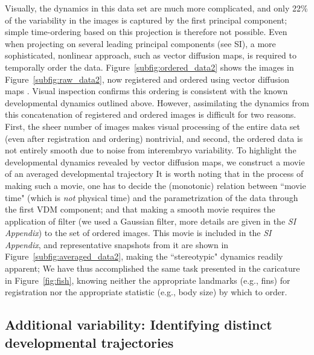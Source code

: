 \documentclass{pnastwo}
\begin{document}
\begin{article}
Visually, the dynamics in this data set are much more complicated, and only 22\% of the variability in the images is captured by the first principal component; simple time-ordering based on this projection is therefore not possible.
%
Even when projecting on several leading principal components (see SI), a more sophisticated, nonlinear approach, such as vector diffusion maps, 
is required to temporally order the data.
%
Figure~\ref{subfig:ordered_data2} shows the images in Figure~\ref{subfig:raw_data2}, now registered and ordered using vector diffusion maps \cite{singer2012vector}.
%
Visual inspection confirms this ordering is consistent with the known developmental dynamics outlined above.
%
However, assimilating the dynamics from this concatenation of registered and ordered images is difficult for two reasons.
%
First, the sheer number of images makes visual processing of the entire data set (even after registration and ordering) nontrivial, and
second, the ordered data is not entirely smooth due to noise from interembryo variability.
%
To highlight the developmental dynamics revealed by vector diffusion maps, we construct a movie of an averaged developmental trajectory 
%
It is worth noting that in the process of making such a movie, one has to decide the (monotonic) relation between
``movie time" (which is {\em not} physical time) and the parametrization of the data through the first VDM component; and that making a smooth movie
requires the application of filter (we used a Gaussian filter, more details are given in the {\it SI Appendix}) to the set of ordered images.
%
This movie is included in the {\it SI Appendix},
and representative snapshots from it are shown in Figure~\ref{subfig:averaged_data2}, making the ``stereotypic" dynamics readily apparent;
%
%
%
We have thus accomplished the same task presented in the caricature in Figure~\ref{fig:fish}, knowing neither the appropriate landmarks (e.g., fins) for registration nor the appropriate statistic (e.g., body size) by which to order.



\subsection{Additional variability: Identifying distinct developmental trajectories}


\end{article}
\end{document}
